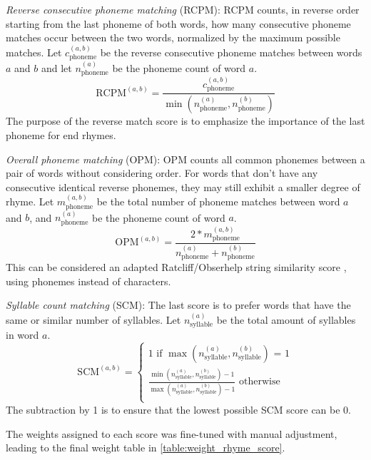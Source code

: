 \documentclass[11pt,a4paper]{article}
\newenvironment{tight_itemize}{
\begin{itemize}
\setlength{\itemsep}{0pt}
\setlength{\parskip}{0pt}
}{\end{itemize}}
\begin{document}
\begin{tight_itemize}
	\vspace{-0.5em}
	\item \textit{Reverse consecutive phoneme matching} (RCPM):
	RCPM counts, in reverse order starting from the last phoneme of both words, how many consecutive phoneme matches occur between the two words, normalized by the maximum possible matches. Let $c^{(a,b)}_{\text{phoneme}}$ be the reverse consecutive phoneme matches between words $a$ and $b$ and let $n^{(a)}_{\text{phoneme}}$ be the phoneme count of word $a$.
	$$\textrm{RCPM}^{(a,b)} = \frac{c^{(a,b)}_{\text{phoneme}}}{\min(n^{(a)}_{\text{phoneme}}, n^{(b)}_{\text{phoneme}})}$$
	The purpose of the reverse match score is to emphasize the importance of the last phoneme for end rhymes.
	\item \textit{Overall phoneme matching} (OPM):
		OPM counts all common phonemes between a pair of words without considering order. For words that don't have any consecutive identical reverse phonemes, they may still exhibit a smaller degree of rhyme. Let $m^{(a,b)}_{\text{phoneme}}$ be the total number of phoneme matches between word $a$ and $b$, and $n^{(a)}_{\text{phoneme}}$ be the phoneme count of word $a$.
		$$\textrm{OPM}^{(a,b)} = \frac{2 * m^{(a,b)}_{\text{phoneme}}}{n^{(a)}_{\text{phoneme}} + n^{(b)}_{\text{phoneme}}}$$
		This can be considered an adapted Ratcliff/Obserhelp string similarity score \cite{ratcliff}, using phonemes instead of characters.
	\item \textit{Syllable count matching} (SCM):
	The last score is to prefer words that have the same or similar number of syllables. Let $n^{(a)}_{\text{syllable}}$ be the total amount of syllables in word $a$.
	\begin{equation}
	\textrm{SCM}^{(a,b)} = 
	\begin{cases}
	\nonumber 1 \text{ if $\max(n^{(a)}_{\text{syllable}}, n^{(b)}_{\text{syllable}})$ = 1}\\
	\nonumber \frac{\min(n^{(a)}_{\text{syllable}}, n^{(b)}_{\text{syllable}}) - 1}{\max(n^{(a)}_{\text{syllable}}, n^{(b)}_{\text{syllable}}) - 1} \text{ otherwise}\\
        \end{cases}
	\end{equation}
	The subtraction by 1 is to ensure that the lowest possible SCM score can be 0.
\end{tight_itemize}

The weights assigned to each score was fine-tuned with manual adjustment, leading to the final weight table in \ref{table:weight_rhyme_score}.
\end{document}
